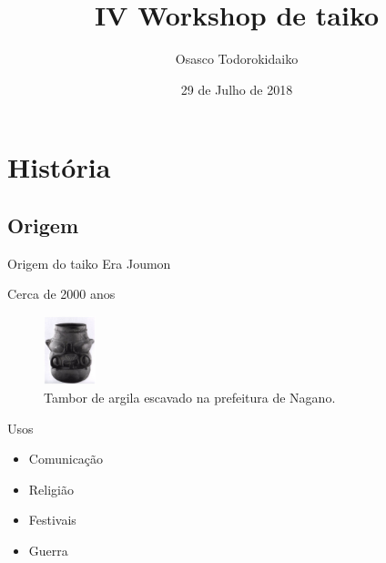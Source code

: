 \documentclass{beamer}
\title{IV Workshop de taiko}
\author{Osasco Todorokidaiko}
\date{29 de Julho de 2018}
\begin{document}
\begin{frame}
    \maketitle
\end{frame}

\section{História}
\subsection{Origem}
\begin{frame}{Origem do taiko}\pause
    Era Joumon

    Cerca de 2000 anos
    \begin{figure}
    \includegraphics[height=2cm]{taiko-jomon}
        \caption {Tambor de argila escavado na prefeitura de Nagano.}
    \end{figure}

\end{frame}

\begin{frame}{Usos}
    \begin{itemize}\pause
        \item Comunicação \pause
        \item Religião \pause
        \item Festivais \pause
        \item Guerra
    \end{itemize}
\end{frame}
\end{document}
